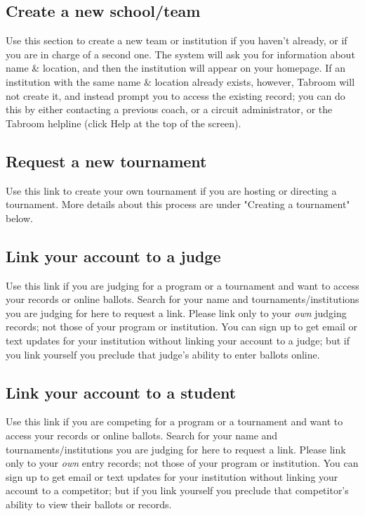\documentclass[12pt]{report}
\begin{document}
		\subsection{Create a new school/team}
			
			Use this section to create a new team or institution if you haven't
			already, or if you are in charge of a second one.  The system will
			ask you for information about name \& location, and then the
			institution will appear on your homepage.  If an institution with
			the same name \& location already exists, however, Tabroom will not
			create it, and instead prompt you to access the existing record;
			you can do this by either contacting a previous coach, or a circuit
			administrator, or the Tabroom helpline (click Help at the top of
			the screen).

		\subsection{Request a new tournament}

			Use this link to create your own tournament if you are hosting
			or directing a tournament.   More details about this process are
			under "Creating a tournament" below.

		\subsection{Link your account to a judge}

			Use this link if you are judging for a program or a tournament and
			want to access your records or online ballots.  Search for your
			name and tournaments/institutions you are judging for here to
			request a link.  Please link only to your \emph{own} judging
			records; not those of your program or institution.  You can sign up
			to get email or text updates for your institution without linking
			your account to a judge; but if you link yourself you preclude that
			judge's ability to enter ballots online.

		\subsection{Link your account to a student}

			Use this link if you are competing for a program or a tournament
			and want to access your records or online ballots.  Search for your
			name and tournaments/institutions you are judging for here to
			request a link.  Please link only to your \emph{own} entry records;
			not those of your program or institution.  You can sign up to get
			email or text updates for your institution without linking your
			account to a competitor; but if you link yourself you preclude that
			competitor's ability to view their ballots or records.
\end{document}
